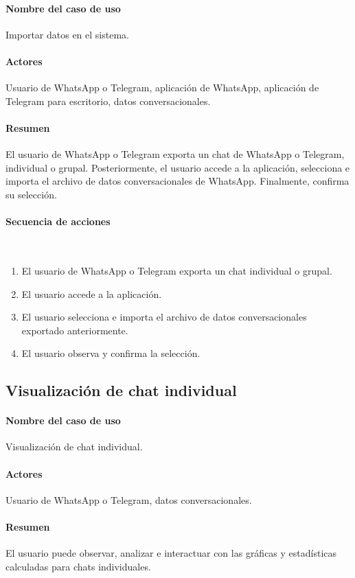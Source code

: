 \paragraph{Nombre del caso de uso} Importar datos en el sistema.
\paragraph{Actores} Usuario de WhatsApp o Telegram, aplicación de WhatsApp, aplicación de Telegram para escritorio, datos conversacionales.
\paragraph{Resumen} El usuario de WhatsApp o Telegram exporta un chat de WhatsApp o Telegram, individual o grupal. Posteriormente, el usuario accede a la aplicación, selecciona e importa el archivo de datos conversacionales de WhatsApp. Finalmente, confirma su selección.
\paragraph{Secuencia de acciones}\mbox{}\\

\begin{enumerate}
	\item El usuario de WhatsApp o Telegram exporta un chat individual o grupal.
	\item El usuario accede a la aplicación.
	\item El usuario selecciona e importa el archivo de datos conversacionales exportado anteriormente.
	\item El usuario observa y confirma la selección.
\end{enumerate}

\subsection{Visualización de chat individual}

\paragraph{Nombre del caso de uso} Visualización de chat individual.
\paragraph{Actores} Usuario de WhatsApp o Telegram, datos conversacionales.
\paragraph{Resumen} El usuario puede observar, analizar e interactuar con las gráficas y estadísticas calculadas para chats individuales.
